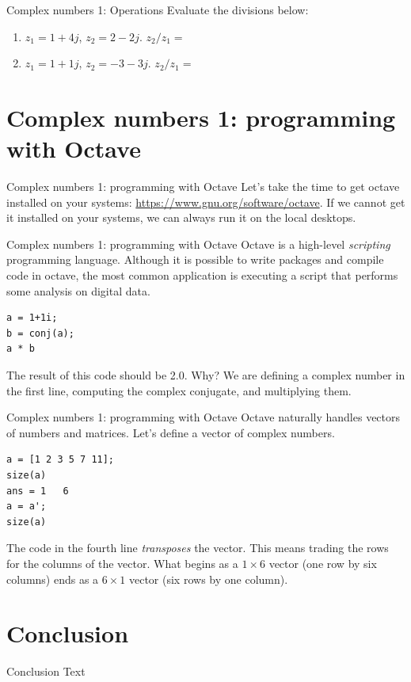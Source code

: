 \documentclass{beamer}
\begin{document}
\begin{frame}{Complex numbers 1: Operations}
Evaluate the divisions below:
\begin{enumerate}
\item $z_1 = 1+4j$, $z_2 = 2-2j$.  $z_2/z_1 = $
\item $z_1 = 1+1j$, $z_2 = -3-3j$.  $z_2/z_1 = $
\end{enumerate}
\end{frame}

\section{Complex numbers 1: programming with Octave}

\begin{frame}{Complex numbers 1: programming with Octave}
Let's take the time to get octave installed on your systems: \url{https://www.gnu.org/software/octave}.  If we cannot get it installed on your systems, we can always run it on the local desktops.
\end{frame}

\begin{frame}[fragile]{Complex numbers 1: programming with Octave}
Octave is a high-level \textit{scripting} programming language.  Although it is possible to write packages and compile code in octave, the most common application is executing a script that performs some analysis on digital data. \\
\begin{verbatim}
a = 1+1i;
b = conj(a);
a * b
\end{verbatim}
The result of this code should be 2.0.  Why?  We are defining a complex number in the first line, computing the complex conjugate, and multiplying them.
\end{frame}

\begin{frame}[fragile]{Complex numbers 1: programming with Octave}
Octave naturally handles vectors of numbers and matrices.  Let's define a vector of complex numbers. \\
\begin{verbatim}
a = [1 2 3 5 7 11];
size(a)
ans = 1   6
a = a';
size(a)
\end{verbatim}
The code in the fourth line \textit{transposes} the vector.  This means trading the rows for the columns of the vector.  What begins as a $1 \times 6$ vector (one row by six columns) ends as a $6 \times 1$ vector (six rows by one column).
\end{frame}

\section{Conclusion}

\begin{frame}{Conclusion}
Text
\end{frame}
\end{document}
